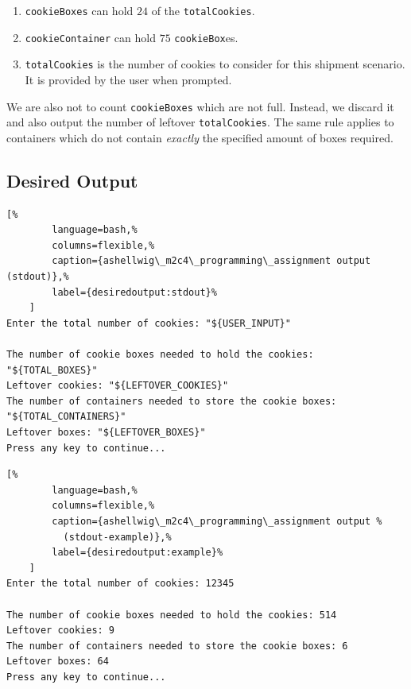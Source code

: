 \documentclass[a4paper, 11pt]{article}
\begin{document}
      \begin{enumerate}
        \item \texttt{cookieBoxes} can hold $24$ of the \texttt{totalCookies}.
        \item \texttt{cookieContainer} can hold $75$ \texttt{cookieBox}es.
        \item \texttt{totalCookies} is the number of cookies to consider for
          this shipment scenario. It is provided by the user when prompted.
      \end{enumerate}

      We are also not to count \texttt{cookieBoxes} which are not full. Instead,
        we discard it and also output the number of leftover
        \texttt{totalCookies}. The same rule applies to containers which do not
        contain \textit{exactly} the specified amount of boxes required.

    \subsection{Desired Output}
      \begin{lstlisting}[%
        language=bash,%
        columns=flexible,%
        caption={ashellwig\_m2c4\_programming\_assignment output (stdout)},%
        label={desiredoutput:stdout}%
    ]
Enter the total number of cookies: "${USER_INPUT}"

The number of cookie boxes needed to hold the cookies: "${TOTAL_BOXES}"
Leftover cookies: "${LEFTOVER_COOKIES}"
The number of containers needed to store the cookie boxes: "${TOTAL_CONTAINERS}"
Leftover boxes: "${LEFTOVER_BOXES}"
Press any key to continue...
      \end{lstlisting}
      \begin{lstlisting}[%
        language=bash,%
        columns=flexible,%
        caption={ashellwig\_m2c4\_programming\_assignment output %
          (stdout-example)},%
        label={desiredoutput:example}%
    ]
Enter the total number of cookies: 12345

The number of cookie boxes needed to hold the cookies: 514
Leftover cookies: 9
The number of containers needed to store the cookie boxes: 6
Leftover boxes: 64
Press any key to continue...
      \end{lstlisting}


  \newpage
\end{document}

